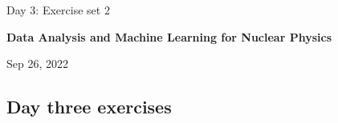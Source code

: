 \documentclass[%
oneside,                 %
final,                   %
10pt]{article}
\begin{document}

\newcommand{\exercisesection}[1]{\subsection*{#1}}






\thispagestyle{empty}

\begin{center}
{\LARGE\bf
\begin{spacing}{1.25}
Day 3: Exercise set 2
\end{spacing}
}
\end{center}


\begin{center}
{\bf Data Analysis and Machine Learning for Nuclear Physics${}^{}$} \\ [0mm]
\end{center}

\begin{center}
\end{center}
    

\begin{center}
Sep 26, 2022
\end{center}

\vspace{1cm}


\subsection*{Day three exercises}
\end{document}
